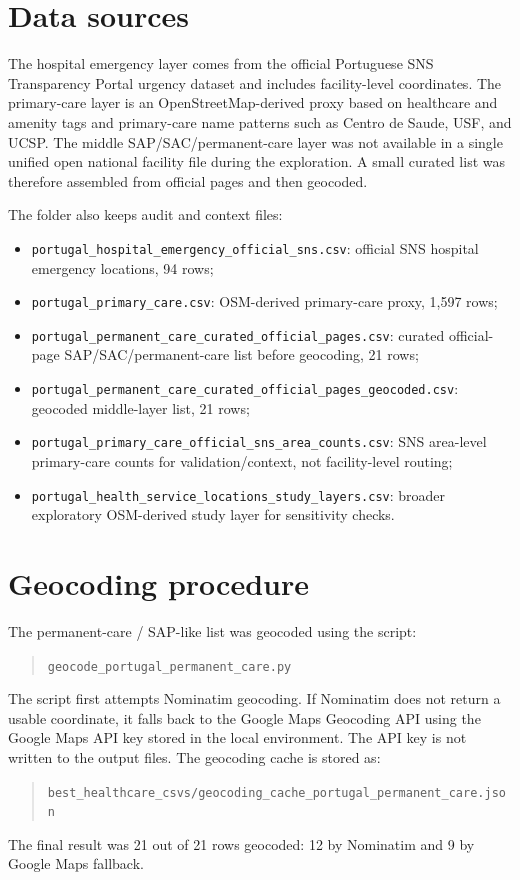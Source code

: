 \documentclass[11pt]{article}
\begin{document}
\section*{Data sources}
The hospital emergency layer comes from the official Portuguese SNS Transparency Portal urgency dataset and includes facility-level coordinates. The primary-care layer is an OpenStreetMap-derived proxy based on healthcare and amenity tags and primary-care name patterns such as Centro de Saude, USF, and UCSP. The middle SAP/SAC/permanent-care layer was not available in a single unified open national facility file during the exploration. A small curated list was therefore assembled from official pages and then geocoded.

The folder also keeps audit and context files:
\begin{itemize}[leftmargin=*]
  \item \texttt{portugal\_hospital\_emergency\_official\_sns.csv}: official SNS hospital emergency locations, 94 rows;
  \item \texttt{portugal\_primary\_care.csv}: OSM-derived primary-care proxy, 1,597 rows;
  \item \texttt{portugal\_permanent\_care\_curated\_official\_pages.csv}: curated official-page SAP/SAC/permanent-care list before geocoding, 21 rows;
  \item \texttt{portugal\_permanent\_care\_curated\_official\_pages\_geocoded.csv}: geocoded middle-layer list, 21 rows;
  \item \texttt{portugal\_primary\_care\_official\_sns\_area\_counts.csv}: SNS area-level primary-care counts for validation/context, not facility-level routing;
  \item \texttt{portugal\_health\_service\_locations\_study\_layers.csv}: broader exploratory OSM-derived study layer for sensitivity checks.
\end{itemize}

\section*{Geocoding procedure}
The permanent-care / SAP-like list was geocoded using the script:
\begin{quote}
\texttt{geocode\_portugal\_permanent\_care.py}
\end{quote}
The script first attempts Nominatim geocoding. If Nominatim does not return a usable coordinate, it falls back to the Google Maps Geocoding API using the Google Maps API key stored in the local environment. The API key is not written to the output files. The geocoding cache is stored as:
\begin{quote}
\texttt{best\_healthcare\_csvs/geocoding\_cache\_portugal\_permanent\_care.json}
\end{quote}
The final result was 21 out of 21 rows geocoded: 12 by Nominatim and 9 by Google Maps fallback.
\end{document}
